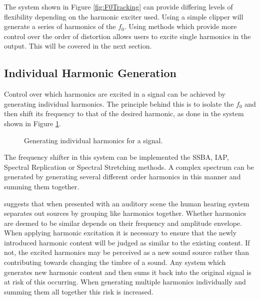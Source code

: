 		The system shown in Figure \ref{fig:F0Tracking} can provide differing levels of flexibility depending on
		the harmonic exciter used. Using a simple clipper will generate a series of harmonics of the $f_{0}$. Using
		methods which provide more control over the order of distortion allows users to excite single harmonics in
		the output. This will be covered in the next section.

	\subsection{Individual Harmonic Generation}
	\label{sec:FeatureControl-Systems-Individuals}
		Control over which harmonics are excited in a signal can be achieved by generating individual harmonics.
		The principle behind this is to isolate the $f_{0}$ and then shift its frequency to that of the desired
		harmonic, as done in the system shown in Figure \ref{fig:HarmonicGenerationSystem}.

		\begin{figure}[h!]
			\centering
			\caption{Generating individual harmonics for a signal.}
			\label{fig:HarmonicGenerationSystem}
		\end{figure}
		
		The frequency shifter in this system can be implemented the SSBA, IAP, Spectral Replication or Spectral
		Stretching methods. A complex spectrum can be generated by generating several different order harmonics in
		this manner and summing them together.
		
		\citet{bregman1994auditory} suggests that when presented with an auditory scene the human hearing system
		separates out sources by grouping like harmonics together. Whether harmonics are deemed to be similar
		depends on their frequency and amplitude envelope. When applying harmonic excitation it is necessary to
		ensure that the newly introduced harmonic content will be judged as similar to the existing content. If
		not, the excited harmonics may be perceived as a new sound source rather than contributing towards changing
		the timbre of a sound. Any system which generates new harmonic content and then sums it back into the
		original signal is at risk of this occurring. When generating multiple harmonics individually and summing
		them all together this risk is increased.

